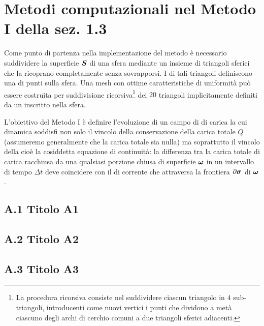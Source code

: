 \chapter{Metodi computazionali nel Metodo I  della sez. 1.3}\label{app:P_01_A}

Come punto di partenza nella implementazione del metodo è necessario suddividere la superficie $\vb*{S}$ di una sfera mediante un insieme di triangoli sferici che la ricoprano completamente senza sovrapporsi. I  di tali triangoli definiscono una  di punti sulla sfera. Una mesh con ottime caratteristiche di uniformità può essere costruita per suddivisione ricorsiva\footnote{La procedura ricorsiva consiste nel suddividere ciascun triangolo in $4$ sub-triangoli, introducenti come nuovi vertici i punti che dividono a metà ciascuno degli archi di cerchio comuni a due triangoli sferici adiacenti.} dei $20$ triangoli implicitamente definiti da un  inscritto nella sfera. 

L'obiettivo del Metodo I è definire l'evoluzione di un campo di  di carica la cui dinamica soddisfi non solo il vincolo della conservazione della carica totale $Q$ (assumeremo generalmente che la carica totale sia nulla) ma soprattutto il vincolo della  cioè la cosiddetta equazione di continuità: la differenza tra la carica totale di carica racchiusa da una qualsiasi porzione chiusa di superficie $\vb*{\omega}$ in un intervallo di tempo $\Delta t$ deve coincidere con il  di corrente che attraversa la frontiera $\partial \vb*{\sigma}$ di  $\vb*{\omega}$.  

\section*{A.1 Titolo A1}\label{sec:A.1}

\section*{A.2 Titolo A2}\label{sec:A.2}

\section*{A.3 Titolo A3}\label{sec:A.3}


